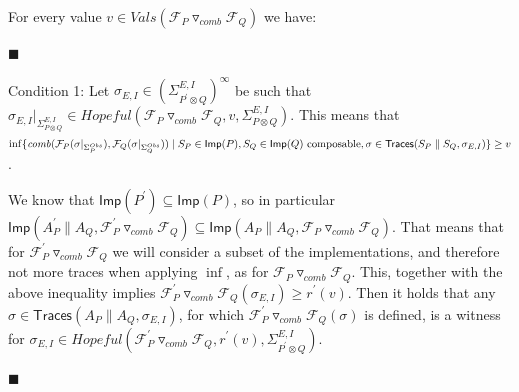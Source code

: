  
 
For every value $v\in Vals({{\mathcal{F}_{P}}\mathbin{\triangledown_{\mathit{comb}}}{\mathcal{F}_{Q}}})$ we have:\par
  
\par\noindent  $\blacksquare$ 
 
Condition 1: Let $\sigma_{E,I}\in(\Sigma_{P^{\prime}\otimes Q}^{E,I})^{\infty}$ be such that $\sigma_{E,I}|_{\Sigma_{P\otimes Q}^{E,I}}\in\mathit{Hopeful}({{\mathcal{F}_{P}}\mathbin{\triangledown_{\mathit{comb}}}{\mathcal{F}_{Q}}},v,\Sigma_{P\otimes Q}^{E,I})$. This means that $\inf\{\mathit{comb}(\mathcal{F}_{P}(\sigma|_{\Sigma_{P}^{Obs}}),\mathcal{F}_{Q}(\sigma|_{\Sigma_{Q}^{Obs}}))\mid S_{P}\in\mathsf{Imp}(P),S_{Q}\in\mathsf{Imp}(Q)\text{ composable},\\
\sigma\in\mathsf{Traces}(S_{P}\parallel S_{Q},\sigma_{E,I})\}\geq v$.\par
 
 
 
We know that $\mathsf{Imp}(P^{\prime})\subseteq\mathsf{Imp}(P)$, so in particular $\mathsf{Imp}(A_{P}^{\prime}\parallel A_{Q},{{\mathcal{F}_{P}^{\prime}}\mathbin{\triangledown_{\mathit{comb}}}{\mathcal{F}_{Q}}})\subseteq\mathsf{Imp}(A_{P}\parallel A_{Q},{{\mathcal{F}_{P}}\mathbin{\triangledown_{\mathit{comb}}}{\mathcal{F}_{Q}}})$. That means that for ${{\mathcal{F}_{P}^{\prime}}\mathbin{\triangledown_{\mathit{comb}}}{\mathcal{F}_{Q}}}$ we will consider a subset of the implementations, and therefore not more traces when applying $\inf$, as for ${{\mathcal{F}_{P}}\mathbin{\triangledown_{\mathit{comb}}}{\mathcal{F}_{Q}}}$. This, together with the above inequality implies ${{\mathcal{F}_{P}^{\prime}}\mathbin{\triangledown_{\mathit{comb}}}{\mathcal{F}_{Q}}}(\sigma_{E,I})\geq r^{\prime}(v)$. Then it holds that any $\sigma\in\mathsf{Traces}(A_{P}\parallel A_{Q},\sigma_{E,I})$, for which ${{\mathcal{F}_{P}^{\prime}}\mathbin{\triangledown_{\mathit{comb}}}{\mathcal{F}_{Q}}}(\sigma)$ is defined, is a witness for $\sigma_{E,I}\in\mathit{Hopeful}({{\mathcal{F}_{P}^{\prime}}\mathbin{\triangledown_{\mathit{comb}}}{\mathcal{F}_{Q}}},r^{\prime}(v),\Sigma_{P^{\prime}\otimes Q}^{E,I})$.\par
 
 
 
\par\noindent  $\blacksquare$ 
 

